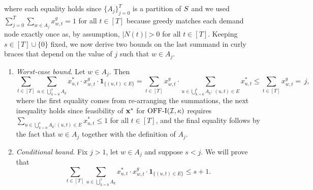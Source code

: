     where each equality holds since $\{A_j\}_{j=0}^T$ is a partition of $S$ and we used $\sum_{j=0}^T \sum_{w \in A_j} x_{w,t}^g = 1$ for all $t \in [T]$ {because greedy matches each demand node exactly once as, by assumption, $|N(t)| > 0$ for all $t \in [T]$.} Keeping $s \in [T]\cup \{0\}$ fixed, we now derive two bounds on the last summand in curly braces that depend on the value of $j$ such that $w\in A_j$. \begin{enumerate}
        \item \textit{Worst-case bound}. Let $w \in A_j$. 
        Then
        \begin{equation}
         \label{proof: adv worst_case_bound}
             \sum_{t \in [T]} \sum_{u \in \bigcup_{k=0}^s A_k} x_{u, t}^* \cdot x_{w,t}^g \cdot \bm{1}_{\{(u,t) \in E\}}  
            = \sum_{t \in [T]} x_{w,t}^g \cdot \sum_{u \in \bigcup_{k=0}^s A_k: \, (u,t) \in E} x_{u, t}^* 
            \leq  \sum_{t \in [T]} x_{w,t}^g
            =\, j,
        \end{equation}
        where the first equality comes from re-arranging the summations, the next inequality holds since feasibility of {$\mathbf{x}^*$} for $\mathrm{\mathrm{OFF}}\textrm{-}\mathrm{I}(\mathcal I,\kappa)$ requires $\sum_{u \in \bigcup_{k=0}^s A_k: (u, t) \in E} x_{u, t}^* \leq 1$ for all $t \in [T]$, and the final equality {follows by the fact that $w \in A_j$ together with the definition of $A_j$.}

        \item \textit{Conditional bound}. Fix $j > 1$, let $w \in A_j$ and suppose  $s<j$. We will prove {that}
        \begin{equation}
        \label{proof: adv conditional_case_bound}
             \sum_{t \in [T]} \sum_{u \in \bigcup_{k=0}^s A_k} x_{u, t}^* \cdot x_{w,t}^g \cdot \bm{1}_{\{ (u,t) \in E \}}  \leq s+1.
        \end{equation}


\end{enumerate}
